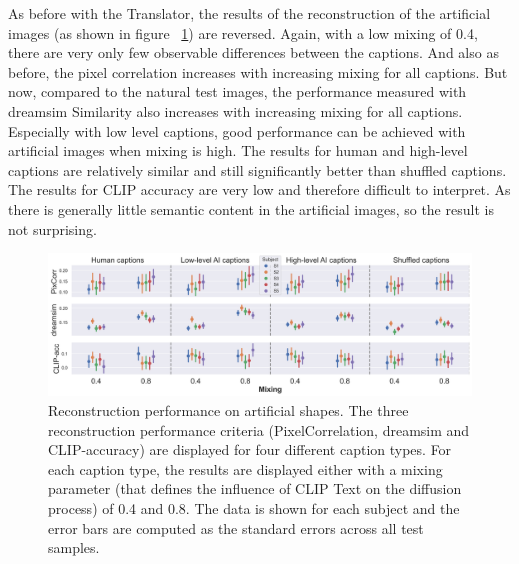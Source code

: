 As before with the Translator, the results of the reconstruction of the artificial images (as shown in figure ~\ref{fig:aicap_reconstruction_art_both_mixings}) are reversed. Again, with a low mixing of 0.4, there are very only few observable differences between the captions. And also as before, the pixel correlation increases with increasing mixing for all captions. But now, compared to the natural test images, the performance measured with dreamsim Similarity also increases with increasing mixing for all captions. Especially with low level captions, good performance can be achieved with artificial images when mixing is high. The results for human and high-level captions are relatively similar and still significantly better than shuffled captions. The results for CLIP accuracy are very low and therefore difficult to interpret. As there is generally little semantic content in the artificial images, so the result is not surprising. 

\begin{figure}[ht]
    \centering
    \includegraphics[width=1\textwidth]{plots/aicap_reconstruction_art_both_mixings.png}
    \caption[Experiment 2: Reconstruction performance on artificial shapes]{Reconstruction performance on artificial shapes. The three reconstruction performance criteria (PixelCorrelation, dreamsim and CLIP-accuracy) are displayed for four different caption types. For each caption type, the results are displayed either with a mixing parameter (that defines the influence of CLIP Text on the diffusion process) of 0.4 and 0.8. The data is shown for each subject and the error bars are computed as the standard errors across all test samples.}\label{fig:aicap_reconstruction_art_both_mixings}
\end{figure}

